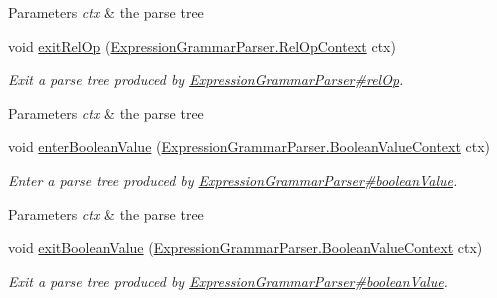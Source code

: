 \begin{DoxyCompactItemize}
\begin{DoxyCompactList}
\begin{DoxyParams}{Parameters}
{\em ctx} & the parse tree\\
\hline
\end{DoxyParams}
 \end{DoxyCompactList}\item 
void \hyperlink{classgov_1_1nasa_1_1jpf_1_1inspector_1_1server_1_1expression_1_1parser_1_1_expression_grammar_base_listener_a212ce034b5fe64061908e4dcec1cfb64}{exit\+Rel\+Op} (\hyperlink{classgov_1_1nasa_1_1jpf_1_1inspector_1_1server_1_1expression_1_1parser_1_1_expression_grammar_parser_1_1_rel_op_context}{Expression\+Grammar\+Parser.\+Rel\+Op\+Context} ctx)
\begin{DoxyCompactList}\small\item\em Exit a parse tree produced by \hyperlink{classgov_1_1nasa_1_1jpf_1_1inspector_1_1server_1_1expression_1_1parser_1_1_expression_grammar_parser_af76d7c4bc312c622f71db248bbfd8f7e}{Expression\+Grammar\+Parser\#rel\+Op}.


\begin{DoxyParams}{Parameters}
{\em ctx} & the parse tree\\
\hline
\end{DoxyParams}
 \end{DoxyCompactList}\item 
void \hyperlink{classgov_1_1nasa_1_1jpf_1_1inspector_1_1server_1_1expression_1_1parser_1_1_expression_grammar_base_listener_aca2cad2c8614cebc81ca3aeaa2bc48cf}{enter\+Boolean\+Value} (\hyperlink{classgov_1_1nasa_1_1jpf_1_1inspector_1_1server_1_1expression_1_1parser_1_1_expression_grammar_parser_1_1_boolean_value_context}{Expression\+Grammar\+Parser.\+Boolean\+Value\+Context} ctx)
\begin{DoxyCompactList}\small\item\em Enter a parse tree produced by \hyperlink{classgov_1_1nasa_1_1jpf_1_1inspector_1_1server_1_1expression_1_1parser_1_1_expression_grammar_parser_a14e9a8c6f6020d08568f2c66cdedf81b}{Expression\+Grammar\+Parser\#boolean\+Value}.


\begin{DoxyParams}{Parameters}
{\em ctx} & the parse tree\\
\hline
\end{DoxyParams}
 \end{DoxyCompactList}\item 
void \hyperlink{classgov_1_1nasa_1_1jpf_1_1inspector_1_1server_1_1expression_1_1parser_1_1_expression_grammar_base_listener_acbb278a955c5995a048ca2a03487c1a1}{exit\+Boolean\+Value} (\hyperlink{classgov_1_1nasa_1_1jpf_1_1inspector_1_1server_1_1expression_1_1parser_1_1_expression_grammar_parser_1_1_boolean_value_context}{Expression\+Grammar\+Parser.\+Boolean\+Value\+Context} ctx)
\begin{DoxyCompactList}\small\item\em Exit a parse tree produced by \hyperlink{classgov_1_1nasa_1_1jpf_1_1inspector_1_1server_1_1expression_1_1parser_1_1_expression_grammar_parser_a14e9a8c6f6020d08568f2c66cdedf81b}{Expression\+Grammar\+Parser\#boolean\+Value}.



\end{DoxyCompactList}
\end{DoxyCompactItemize}
